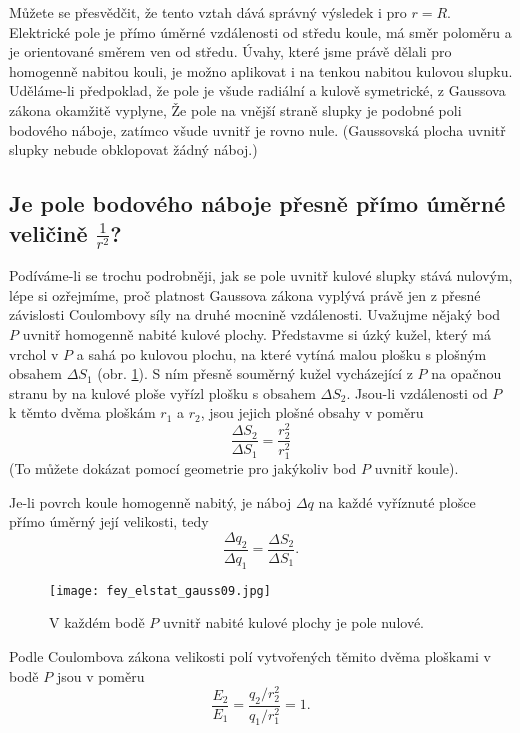       Můžete se přesvědčit, že tento vztah dává správný výsledek i pro \(r=R\). Elektrické pole je přímo 
      úměrné vzdálenosti od středu koule, má směr poloměru a je orientované směrem ven od středu.
      Úvahy, které jsme právě dělali pro homogenně nabitou kouli, je možno aplikovat i na tenkou nabitou 
      kulovou slupku. Uděláme-li předpoklad, že pole je všude radiální a kulově symetrické, z Gaussova zákona 
      okamžitě vyplyne, Že pole na vnější straně slupky je podobné poli bodového náboje, zatímco všude 
      uvnitř je rovno nule. (Gaussovská plocha uvnitř slupky nebude obklopovat žádný náboj.)
      
    \subsection{Je pole bodového náboje přesně přímo úměrné veličině 
                 \texorpdfstring{\(\frac{1}{r^2}\)}{1/r^2}?} 
      Podíváme-li se trochu podrobněji, jak se pole uvnitř kulové slupky stává nulovým, lépe si ozřejmíme, 
      proč platnost Gaussova zákona vyplývá právě jen z přesné závislosti Coulombovy síly na druhé mocnině 
      vzdálenosti. Uvažujme nějaký bod \(P\) uvnitř homogenně nabité kulové plochy. Představme si úzký kužel, 
      který má vrchol v \(P\) a sahá po kulovou plochu, na které vytíná malou plošku s plošným obsahem 
      \(\Delta S_1\) (obr. \ref{fyz:fig_fey_elstat_gauss09}). S ním přesně souměrný kužel vycházející z \(P\) 
      na opačnou stranu by na kulové ploše vyřízl plošku s obsahem \(\Delta S_2\). Jsou-li vzdálenosti od 
      \(P\) k těmto dvěma ploškám \(r_1\) a \(r_2\), jsou jejich plošné obsahy v poměru \[\frac{\Delta 
      S_2}{\Delta S_1} = \frac{r_2^2}{r_1^2}\]
      (To můžete dokázat pomocí geometrie pro jakýkoliv bod \(P\) uvnitř koule).
      
      Je-li povrch koule homogenně nabitý, je náboj \(\Delta q\) na každé vyříznuté plošce přímo úměrný její 
      velikosti, tedy \[\frac{\Delta q_2}{\Delta q_1} = \frac{\Delta S_2}{\Delta S_1}.\]
      
      
      \begin{figure}[ht!] %
        \centering
        \texttt{[image: fey\_elstat\_gauss09.jpg]}
        \caption{V každém bodě \(P\) uvnitř nabité kulové plochy je pole nulové.}
        \label{fyz:fig_fey_elstat_gauss09}
      \end{figure}
      
      Podle Coulombova zákona velikosti polí vytvořených těmito dvěma ploškami v bodě \(P\) jsou v poměru
      \[\frac{E_2}{E_1} = \frac{q_2/r_2^2}{q_1/r_1^2} = 1.\]
      

